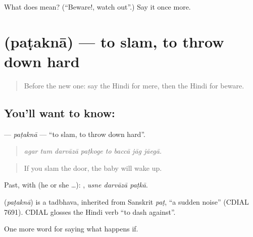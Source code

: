 \begin{tcolorbox}[breakable,colback=teal!4,colframe=teal!35!black,title={Before you move on}]
What does  mean? (\textquotedblleft{}Beware!, watch out\textquotedblright{}.) Say it once more.
\end{tcolorbox}
\section[\texorpdfstring{\hi{पटकना} (paṭaknā)}{पटकना (paṭaknā)}]{ (paṭaknā) — to slam, to throw down hard}

\label{lesson:HI-C379-patakna}



\begin{quote}
Before the new one: say the Hindi for mere, then the Hindi for beware.
\end{quote}

\subsection*{You'll want to know: }
\textbf{} — \emph{paṭaknā} — \textquotedblleft{}to slam, to throw down hard\textquotedblright{}.

\begin{quote}
       
\end{quote}

\begin{quote}
\emph{agar tum darvāzā paṭkoge to baccā jāg jāegā.}
\end{quote}

\begin{quote}
If you slam the door, the baby will wake up.
\end{quote}

Past, with  (he or she …):   , \emph{usne darvāzā paṭkā}.

\begin{cousinweb}
\textbf{} (\emph{paṭaknā}) is a tadbhava, inherited from Sanskrit \emph{paṭ}, \textquotedblleft{}a sudden noise\textquotedblright{} (CDIAL 7691). CDIAL glosses the Hindi verb \textquotedblleft{}to dash against\textquotedblright{}.
\end{cousinweb}

\begin{grammarlens}[title={What you've built}]
One more word for saying what happens if.
\end{grammarlens}

